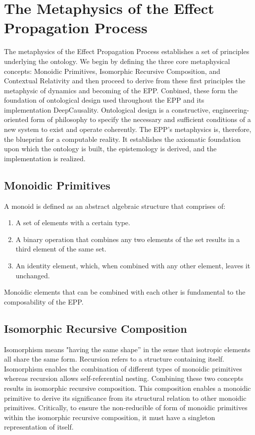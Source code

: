 \section{The Metaphysics of the Effect Propagation Process}
\label{sec:metaphysics}

The metaphysics of the Effect Propagation Process establishes a set of principles underlying the ontology. We begin by defining the three core metaphysical concepts: Monoidic Primitives, Isomorphic Recursive Composition, and Contextual Relativity and then proceed to derive from these first principles the metaphysic of dynamics and becoming of the EPP. Conbined, these form the foundation of ontological design used throughout the EPP and its implementation DeepCausality. Ontological design is a constructive, engineering-oriented form of philosophy to specify the necessary and sufficient conditions of a new system to exist and operate coherently. The EPP's metaphysics is, therefore, the blueprint for a computable reality. It establishes the axiomatic foundation upon which the ontology is built, the epistemology is derived, and the implementation is realized. 

\subsection{Monoidic Primitives} 
\label{sec:metaphysics_monoidic_primitives}

A monoid is defined as an abstract algebraic structure that comprises of:

\begin{enumerate}
	\item A set of elements with a certain type.
	\item A binary operation that combines any two elements of the set results in a third element of the same set.
	\item An identity element, which, when combined with any other element, leaves it unchanged.
\end{enumerate}

  Monoidic elements that can be combined with each other is fundamental to the composability of the EPP.
  
\subsection{Isomorphic Recursive Composition} 
\label{sec:metaphysics_isomorphic_recursive_composition}


Isomorphism means "having the same shape” in the sense that isotropic elements all share the same form. Recursion refers to a structure containing itself. Isomorphism enables the combination of different types of monoidic primitives whereas recursion allows self-referential nesting. Combining these two concepts results in isomorphic recursive composition. This composition enables a monoidic primitive to derive its significance from its structural relation to other monoidic primitives. Critically, to ensure the  non-reducible  of form of monoidic primitives within the isomorphic recursive composition, it  must have a singleton representation of itself. 

